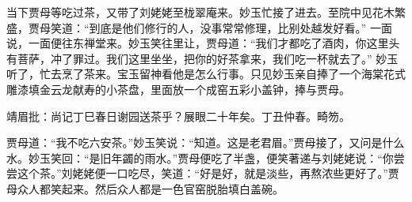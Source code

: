 \begin{parag}
    当下贾母等吃过茶，又带了刘姥姥至栊翠庵来。妙玉忙接了进去。至院中见花木繁盛，贾母笑道：“到底是他们修行的人，没事常常修理，比别处越发好看。” 一面说，一面便往东禅堂来。妙玉笑往里让，贾母道：“我们才都吃了酒肉，你这里头有菩萨，冲了罪过。我们这里坐坐，把你的好茶拿来，我们吃一杯就去了。” 妙玉听了，忙去烹了茶来。宝玉留神看他是怎么行事。只见妙玉亲自捧了一个海棠花式雕漆填金云龙献寿的小茶盘，里面放一个成窑五彩小盖钟，捧与贾母。\begin{note}靖眉批：尚记丁巳春日谢园送茶乎？展眼二十年矣。丁丑仲春。畸笏。\end{note}贾母道：“我不吃六安茶。”妙玉笑说：“知道。这是老君眉。”贾母接了，又问是什么水。妙玉笑回：“是旧年蠲的雨水。”贾母便吃了半盏，便笑著递与刘姥姥说：“你尝尝这个茶。”刘姥姥便一口吃尽，笑道：“好是好，就是淡些，再熬浓些更好了。”贾母众人都笑起来。然后众人都是一色官窑脱胎填白盖碗。
\end{parag}


